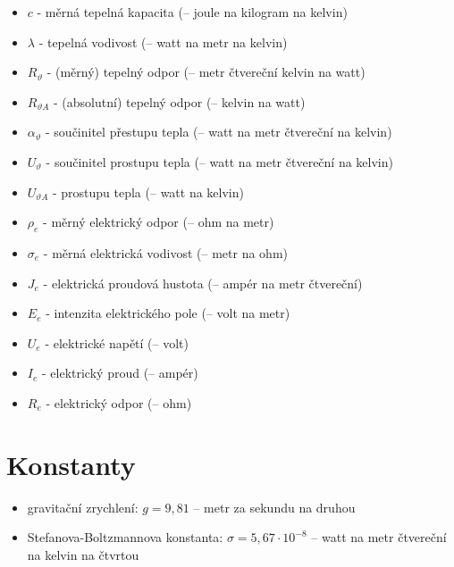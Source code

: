 \documentclass{article}
\begin{document}
\begin{itemize}
    \item $c$ - měrná tepelná kapacita (\ueqJandKGinvKinv \fs -- joule na kilogram na kelvin)
    \item $\lambda$ - tepelná vodivost (\ueqWandMinvKinv \fs -- watt na metr na kelvin)
    \item $R_{\vartheta}$ - (měrný) tepelný odpor (\ueqMsqKandWinv \fs -- metr čtvereční kelvin na watt)
    \item $R_{\vartheta A}$ - (absolutní) tepelný odpor (\ueqKandWinv \fs -- kelvin na watt)
    \item $\alpha_{\vartheta}$ - součinitel přestupu tepla (\ueqWandMinvsqKinv \fs -- watt na metr čtvereční na kelvin)
    \item $U_{\vartheta}$ - součinitel prostupu tepla (\ueqWandMinvsqKinv \fs -- watt na metr čtvereční na kelvin)
    \item $U_{\vartheta A}$ - prostupu tepla (\ueqWandKinv \fs -- watt na kelvin)
    \item $\rho_e$ - měrný elektrický odpor (\ueqOHMandMinv \fs -- ohm na metr)
    \item $\sigma_e$ - měrná elektrická vodivost (\ueqMinvOHMinv \fs -- metr na ohm)
    \item $J_e$ - elektrická proudová hustota (\ueqAandMinvsq \fs -- ampér na metr čtvereční)
    \item $E_e$ - intenzita elektrického pole (\ueqVandMinv \fs -- volt na metr)
    \item $U_e$ - elektrické napětí (\ueqV \fs -- volt)
    \item $I_e$ - elektrický proud (\ueqA \fs -- ampér)
    \item $R_e$ - elektrický odpor (\ueqOHM \fs -- ohm)
\end{itemize}

\newpage



\section{Konstanty}

\begin{itemize}
    \item gravitační zrychlení: $g = 9,81$ \ueqMandSinvsq \fs -- metr za sekundu na druhou
    \item Stefanova-Boltzmannova konstanta: $\sigma = 5,67 \cdot 10^{-8}$ \ueqWandMinvsqKinvq \fs -- watt na metr čtvereční na kelvin na čtvrtou
\end{itemize}
\end{document}
